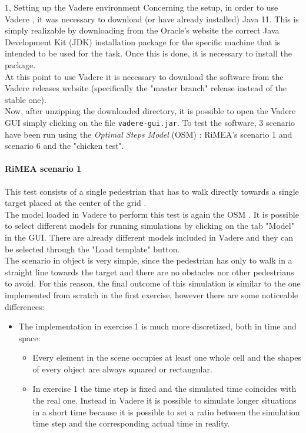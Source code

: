 \documentclass[10pt,a4paper]{article}
\begin{document}
\frontpage

\begin{task}{1, Setting up the Vadere environment}
Concerning the setup, in order to use Vadere \cite{vadere}, it was necessary to download (or have already installed) Java 11.
This is simply realizable by downloading from the Oracle's website \cite{oracle-website} the correct Java Development Kit (JDK) installation package for the specific machine that is intended to be used for the task.
Once this is done, it is necessary to install the package.\\
At this point to use Vadere it is necessary to download the software from the Vadere releases website \cite{vadere-releases-website} (specifically the "master branch" release instead of the stable one).\\
Now, after unzipping the downloaded directory, it is possible to open the Vadere GUI simply clicking on the file \texttt{vadere-gui.jar}.
To test the software, 3 scenario have been run using the \textit{Optimal Steps Model} (OSM) \cite{osm, bridging-the-gap, dynamic-stride-length}: RiMEA's scenario 1 and scenario 6 \cite{rimea} and the "chicken test".

\paragraph{RiMEA scenario 1}
This test consists of a single pedestrian that has to walk directly towards a single target placed at the center of the grid \cite{rimea}.\\
The model loaded in Vadere to perform this test is again the OSM \cite{osm, bridging-the-gap, dynamic-stride-length}.
It is possible to select different models for running simulations by clicking on the tab "Model" in the GUI.
There are already different models included in Vadere and they can be selected through the "Load template" button.\\
The scenario in object is very simple, since the pedestrian has only to walk in a straight line towards the target and there are no obstacles nor other pedestrians to avoid.
For this reason, the final outcome of this simulation is similar to the one implemented from scratch in the first exercise, however there are some noticeable differences:
\begin{itemize}
    \item The implementation in exercise 1 is much more discretized, both in time and space:
    
    \begin{itemize}
        \item Every element in the scene occupies at least one whole cell and the shapes of every object are always squared or rectangular.
        \item In exercise 1 the time step is fixed and the simulated time coincides with the real one.
        Instead in Vadere it is possible to simulate longer situations in a short time because it is possible to set a ratio between the simulation time step and the corresponding actual time in reality.
    \end{itemize}
    

\end{itemize}
\end{task}
\end{document}
